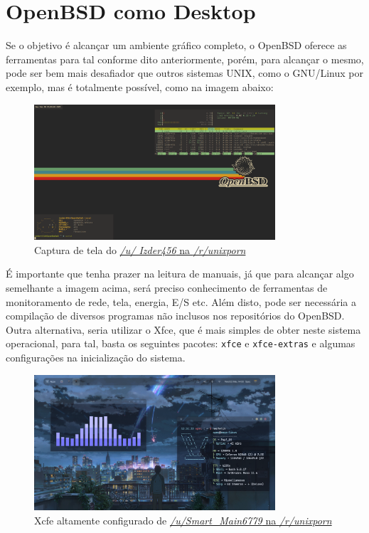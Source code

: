 \documentclass[a4paper,10pt]{article}
\begin{document}
\section{OpenBSD como Desktop}

Se o objetivo é alcançar um ambiente gráfico completo, o OpenBSD oferece as ferramentas para tal conforme dito anteriormente, porém, para alcançar o mesmo, pode ser bem mais desafiador que outros sistemas UNIX, como o GNU/Linux por exemplo, mas é totalmente possível, como na imagem abaixo:

\begin{figure}[!ht]
    \centering
    \includegraphics[width=0.8\textwidth]{imagens/desktop.png}
    \caption{Captura de tela do \href{https://www.reddit.com/r/unixporn/comments/t3zgiu/ratpoison_lightweight_openbsdcurrent_gruvbox/}{\textit{/u/
Izder456} na \textit{/r/unixporn}}}
\end{figure}

É importante que tenha prazer na leitura de manuais, já que para alcançar algo semelhante a imagem acima, será preciso conhecimento de ferramentas de monitoramento de rede, tela, energia, E/S etc. Além disto, pode ser necessária a compilação de diversos programas não inclusos nos repositórios do OpenBSD. Outra alternativa, seria utilizar o Xfce, que é mais simples de obter neste sistema operacional, para tal, basta os seguintes pacotes: \verb|xfce| e \verb|xfce-extras| e algumas configurações na inicialização do sistema.

\begin{figure}[!ht]
    \centering
    \includegraphics[width=0.8\textwidth]{imagens/xfce.png}
    \caption{Xcfe altamente configurado de \href{https://www.reddit.com/r/unixporn/comments/11yc4d2/xfce_first_xfce_rice/}{\textit{/u/Smart\_Main6779} na \textit{/r/unixporn}}}
\end{figure}
\end{document}
